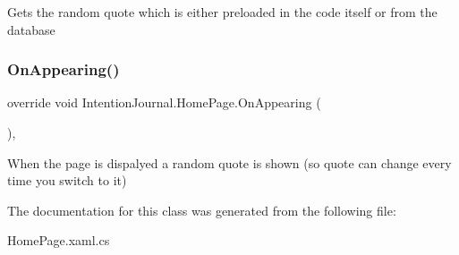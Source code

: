 Gets the random quote which is either preloaded in the code itself or from the database 

\mbox{\label{class_intention_journal_1_1_home_page_a204c50a6ce564041bf17f06ec3686e9f}} 
\subsubsection{\texorpdfstring{On\+Appearing()}{OnAppearing()}}
{\footnotesize\ttfamily override void Intention\+Journal.\+Home\+Page.\+On\+Appearing (\begin{DoxyParamCaption}{ }\end{DoxyParamCaption})\hspace{0.3cm}{\ttfamily [inline]}, {\ttfamily [protected]}}



When the page is dispalyed a random quote is shown (so quote can change every time you switch to it) 



The documentation for this class was generated from the following file\+:\begin{DoxyCompactItemize}
\item 
Home\+Page.\+xaml.\+cs\end{DoxyCompactItemize}
